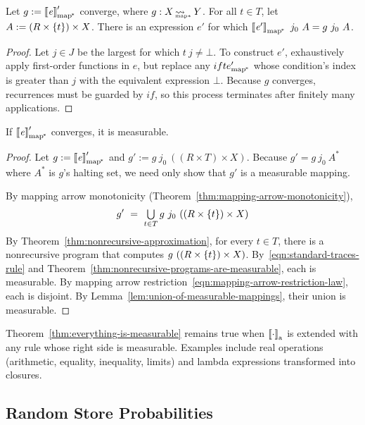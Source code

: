 \documentclass[preprint]{sigplanconf}
\newcommand{\arrow}{\rightsquigarrow}
\newcommand{\arrowif}{\ensuremath{ifte}}
\newcommand{\gen}{_\mathrm{a}}
\newcommand{\pmap}{_\mathrm{map^{\mspace{-2mu}*}}}
\DeclareMathOperator{\pmapto}{\arrow_{\mspace{-22mu}_{\mathrm{map*}}}}
\newcommand{\ifpmap}{\arrowif\pmap}
\begin{document}
\begin{theorem}
Let $g := \meaningof{\mathit{e}}\pmap'$ converge, where $g : X \pmapto Y$.
For all $t \in T$, let $A := (R \times \{{t}\}) \times X$.
There is an expression $\mathit{e'}$ for which $\meaningof{\mathit{e'}}\pmap~j_0~A = g~j_0~A$.
\label{thm:nonrecursive-approximation}
\end{theorem}
\begin{proof}
Let $j \in J$ be the largest for which $t~j \neq \bot$.
To construct $\mathit{e'}$, exhaustively apply first-order functions in $\mathit{e}$, but replace any $\ifpmap'$ whose condition's index is greater than $j$ with the equivalent expression $\bot$.
Because $g$ converges, recurrences must be guarded by $if$, so this process terminates after finitely many applications.
\end{proof}

\begin{theorem}
If $\meaningof{\mathit{e}}\pmap'$ converges, it is measurable.
\label{thm:everything-is-measurable}
\end{theorem}
\begin{proof}
Let $g := \meaningof{\mathit{e}}\pmap'$ and $g' := g~j_0~((R \times T) \times X)$.
Because $g' = g~j_0~A^*$ where $A^*$ is $g$'s halting set, we need only show that $g'$ is a measurable mapping.

By mapping arrow monotonicity (Theorem~\ref{thm:mapping-arrow-monotonicity}),
\begin{align*}
	g' \ =\ \textstyle\bigcup\limits_{t \in T} g~j_0~((R \times \{{t}\}) \times X)
\end{align*}
By Theorem~\ref{thm:nonrecursive-approximation}, for every $t \in T$, there is a nonrecursive program that computes $g~((R \times \{{t}\}) \times X)$.
By~\eqref{eqn:standard-traces-rule} and Theorem~\ref{thm:nonrecursive-programs-are-measurable}, each is measurable.
By mapping arrow restriction~\eqref{eqn:mapping-arrow-restriction-law}, each is disjoint.
By Lemma~\ref{lem:union-of-measurable-mappings}, their union is measurable.
\end{proof}

Theorem~\ref{thm:everything-is-measurable} remains true when $\meaningof{\cdot}\gen$ is extended with any rule whose right side is measurable.
Examples include real operations (arithmetic, equality, inequality, limits) and lambda expressions transformed into closures.

\subsection{Random Store Probabilities}
\end{document}

